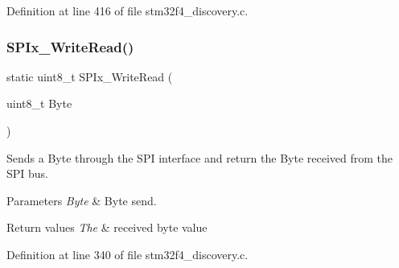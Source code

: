 Definition at line 416 of file stm32f4\+\_\+discovery.\+c.

\mbox{\label{group___s_t_m32_f4___d_i_s_c_o_v_e_r_y___l_o_w___l_e_v_e_l___b_u_s___functions_ga76873bcbb97982478f4f834530d5ac36}} 
\subsubsection{\texorpdfstring{S\+P\+Ix\+\_\+\+Write\+Read()}{SPIx\_WriteRead()}}
{\footnotesize\ttfamily static uint8\+\_\+t S\+P\+Ix\+\_\+\+Write\+Read (\begin{DoxyParamCaption}\item[{uint8\+\_\+t}]{Byte }\end{DoxyParamCaption})\hspace{0.3cm}{\ttfamily [static]}}



Sends a Byte through the S\+PI interface and return the Byte received from the S\+PI bus. 


\begin{DoxyParams}{Parameters}
{\em Byte} & Byte send. \\
\hline
\end{DoxyParams}

\begin{DoxyRetVals}{Return values}
{\em The} & received byte value \\
\hline
\end{DoxyRetVals}


Definition at line 340 of file stm32f4\+\_\+discovery.\+c.


